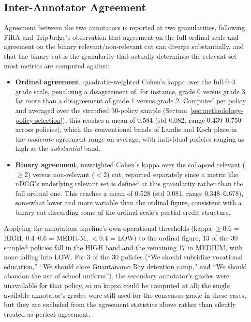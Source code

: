 \subsection{Inter-Annotator Agreement}
\label{sec:methodology-groundtruth-agreement}

Agreement between the two annotators is reported at two granularities, following FiRA
\cite{hofstatter2020fira} and TripJudge's \cite{althammer2022tripjudge} observation that
agreement on the full ordinal scale and agreement on the binary relevant/non-relevant cut can
diverge substantially, and that the binary cut is the granularity that actually determines the
relevant set most metrics are computed against:

\begin{itemize}
\item \textbf{Ordinal agreement}, quadratic-weighted Cohen's kappa \cite{cohen1968kappa} over the
full 0--3 grade scale, penalizing a disagreement of, for instance, grade 0 versus grade 3 far more
than a disagreement of grade 1 versus grade 2. Computed per policy and averaged over the
stratified 30-policy sample (Section~\ref{sec:methodology-policy-selection}), this reaches a mean
of 0.584 (std 0.082, range 0.439--0.750 across policies), which the conventional bands of Landis
and Koch \cite{landis1977kappa} place in the \emph{moderate} agreement range on average, with
individual policies ranging as high as the \emph{substantial} band.

\item \textbf{Binary agreement}, unweighted Cohen's kappa over the collapsed relevant ($\geq 2$)
versus non-relevant ($< 2$) cut, reported separately since a metric like nDCG's underlying
relevant set is defined at this granularity rather than the full ordinal one. This reaches a mean
of 0.528 (std 0.081, range 0.348--0.678), somewhat lower and more variable than the ordinal
figure, consistent with a binary cut discarding some of the ordinal scale's partial-credit
structure.
\end{itemize}

Applying the annotation pipeline's own operational thresholds (kappa $\geq 0.6$ = HIGH, $0.4$--$0.6$
= MEDIUM, $<0.4$ = LOW) to the ordinal figure, 13 of the 30 sampled policies fall in the HIGH band
and the remaining 17 in MEDIUM, with none falling into LOW. For 3 of the 30 policies (``We should
subsidize vocational education,'' ``We should close Guantanamo Bay detention camp,'' and ``We
should abandon the use of school uniform''), the secondary annotator's grades were unavailable for
that policy, so no kappa could be computed at all; the single available annotator's grades were
still used for the consensus grade in these cases, but they are excluded from the agreement
statistics above rather than silently treated as perfect agreement.

